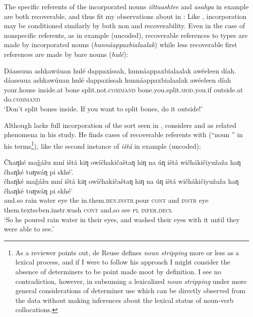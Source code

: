 \documentclass[output=paper]{LSP/langsci}
\begin{document}
	The specific referents of the incorporated nouns \emph{iíttaashtee} and \emph{asahpa} in example  are both recoverable, and thus fit my observations about  in : Like , incorporation may be conditioned similarly by both non and recoverability. Even in the case of nonspecific referents, as in example  (uncoded), recoverable references to types are made by incorporated nouns (\emph{‎hunnáappaxbialaalak}) while less recoverable first references are made by bare nouns (\emph{hulé}):
	 
\ea\label{splitbones}
 	Dáassuua ashkawúuan hulé dappaxíssah, hunnáappaxbialaalak awéeleen díah.\footnotemark\\
\gll	dáassuua		ashkawúuan		hulé		dappaxíssah				hunnáappaxbialaalak			awéeleen		díah\\
	your.house		inside.at		bone		split.not.\textsc{command}	bone.you.split.\textsc{mod}.you.if	outside.at		do.\textsc{command}\\
\glt	`Don’t split bones inside. If you want to split bones, do it outside!' 
\z

	Although  lacks full incorporation of the sort seen in , \citet{deReuse1994} considers  and  as related phenomena in his study. He finds cases of recoverable referents with  (“noun ” in his terms\footnote{As a reviewer points out, de Reuse defines \emph{noun stripping} more or less as a lexical process, and if I were to follow his approach I might consider the absence of determiners to be point made moot by definition. I see no contradiction, however, in subsuming a lexicalized \emph{noun stripping} under more general considerations of determiner use which can be directly observed from the data without making inferences about the lexical status of noun-verb collocations.}), like the second instance of \emph{ištá} in example  (uncoded):
	
\ea\label{lakhotaeye}
 	Čhaƞké maǧážu mní ištá kiƞ owíčhakičaštaƞ hiƞ na úƞ ištá wičhákičiyužaža haƞ čhaƞké tuƞwáƞ pi skhé’.\footnotemark\\
\gll	čhaƞké	maǧážu	mní	ištá	kiƞ	owíčhakičaštaƞ			hiƞ			na	úƞ			ištá		wičhákičiyužaža			haƞ			čhaƞké		tuƞwáƞ	pi		skhé’\\
	and.so	rain		water	eye	the	in.them.\textsc{ben.instr}.pour	\textsc{cont}	and	\textsc{instr}	eye		them.textsc{ben.instr}.wash	\textsc{cont}	and.so	see		\textsc{pl}	\textsc{infer.decl}\\
\glt	`So he poured rain water in their eyes, and washed their eyes with it until they were able to see.'
\z
\end{document}

